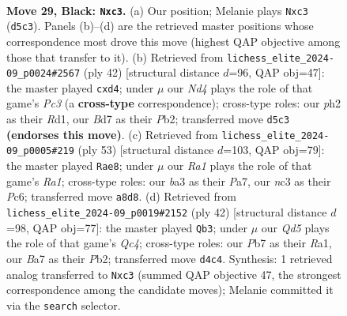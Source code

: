 \documentclass[11pt]{article}
\begin{document}
\clearpage

\begin{figure}[p]\centering
\begin{subfigure}{0.46\textwidth}\centering
\resizebox{\linewidth}{!}{%
\newchessgame
\chessboard[
  setfen={r3r2k/bp1b1pp1/p3p3/3n3P/3q4/BPNp1Q1B/P2P1PKP/R3R3 b - - 3 29},
  showmover=false,
  pgfstyle=straightmove, color=movearrow, markmove={d5-c3}
]}
\caption{}
\end{subfigure}\hfill
\begin{subfigure}{0.46\textwidth}\centering
\resizebox{\linewidth}{!}{%
\newchessgame
\chessboard[
  setfen={3rk2r/pp2bpp1/4p2p/5q2/3p2nP/2P2P2/PPNBQ1P1/1K1R2R1 w k - 0 22},
  showmover=false,
  pgfstyle=straightmove, color=movearrow, markmove={c3-d4}
]}
\caption{}
\end{subfigure}
\\[4pt]
\begin{subfigure}{0.46\textwidth}\centering
\resizebox{\linewidth}{!}{%
\newchessgame
\chessboard[
  setfen={r5k1/pp2r1p1/2pb3p/1P1pn3/P4Nbq/2QB4/1BP3PP/4RR1K b - - 5 27},
  showmover=false,
  pgfstyle=straightmove, color=movearrow, markmove={a8-e8}
]}
\caption{}
\end{subfigure}\hfill
\begin{subfigure}{0.46\textwidth}\centering
\resizebox{\linewidth}{!}{%
\newchessgame
\chessboard[
  setfen={r4rk1/3p2pp/b1p1p3/pNP1b2q/PnQ1B3/4B1P1/1P3P1P/R4RK1 w - - 0 22},
  showmover=false,
  pgfstyle=straightmove, color=movearrow, markmove={c4-b3}
]}
\caption{}
\end{subfigure}
\caption{\textbf{Move 29, Black: \texttt{Nxc3}.} (a) Our position; Melanie plays \texttt{Nxc3} (\texttt{d5c3}). Panels (b)--(d) are the retrieved master positions whose correspondence most drove this move (highest QAP objective among those that transfer to it). (b) Retrieved from \texttt{lichess\_elite\_2024-09\_p0024\#2567} (ply 42) [structural distance $d$=96, QAP obj=47]: the master played \texttt{cxd4}; under $\mu$ our \emph{Nd4} plays the role of that game's \emph{Pc3} (a \textbf{cross-type} correspondence); cross-type roles: our \emph{p}h2 as their \emph{R}d1, our \emph{B}d7 as their \emph{P}b2; transferred move \texttt{d5c3} \textbf{(endorses this move)}. (c) Retrieved from \texttt{lichess\_elite\_2024-09\_p0005\#219} (ply 53) [structural distance $d$=103, QAP obj=79]: the master played \texttt{Rae8}; under $\mu$ our \emph{Ra1} plays the role of that game's \emph{Ra1}; cross-type roles: our \emph{b}a3 as their \emph{P}a7, our \emph{n}c3 as their \emph{P}c6; transferred move \texttt{a8d8}. (d) Retrieved from \texttt{lichess\_elite\_2024-09\_p0019\#2152} (ply 42) [structural distance $d$=98, QAP obj=77]: the master played \texttt{Qb3}; under $\mu$ our \emph{Qd5} plays the role of that game's \emph{Qc4}; cross-type roles: our \emph{P}b7 as their \emph{R}a1, our \emph{B}a7 as their \emph{P}b2; transferred move \texttt{d4c4}. Synthesis: 1 retrieved analog transferred to \texttt{Nxc3} (summed QAP objective 47, the strongest correspondence among the candidate moves); Melanie committed it via the \texttt{search} selector.}
\label{fig:thought-m57}
\end{figure}
\end{document}

